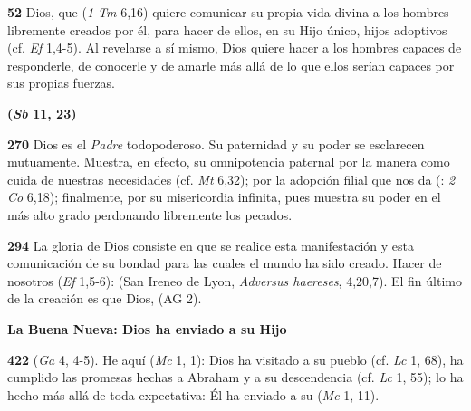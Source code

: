\textbf{52} Dios, que  (\emph{1 Tm} 6,16) quiere comunicar su propia vida divina a los hombres libremente creados por él, para hacer de ellos, en su Hijo único, hijos adoptivos (cf. \emph{Ef} 1,4-5). Al revelarse a sí mismo, Dios quiere hacer a los hombres capaces de responderle, de conocerle y de amarle más allá de lo que ellos serían capaces por sus propias fuerzas.

\textbf{ (\emph{Sb} 11, 23)}

\textbf{270} Dios es el \emph{Padre} todopoderoso. Su paternidad y su poder se esclarecen mutuamente. Muestra, en efecto, su omnipotencia paternal por la manera como cuida de nuestras necesidades (cf. \emph{Mt} 6,32); por la adopción filial que nos da (: \emph{2 Co} 6,18); finalmente, por su misericordia infinita, pues muestra su poder en el más alto grado perdonando libremente los pecados.

\textbf{294} La gloria de Dios consiste en que se realice esta manifestación y esta comunicación de su bondad para las cuales el mundo ha sido creado. Hacer de nosotros  (\emph{Ef} 1,5-6):  (San Ireneo de Lyon, \emph{Adversus haereses}, 4,20,7). El fin último de la creación es que Dios,  (AG 2).

\textbf{La Buena Nueva: Dios ha enviado a su Hijo}

\textbf{422}  (\emph{Ga} 4, 4-5). He aquí  (\emph{Mc} 1, 1): Dios ha visitado a su pueblo (cf. \emph{Lc} 1, 68), ha cumplido las promesas hechas a Abraham y a su descendencia (cf. \emph{Lc} 1, 55); lo ha hecho más allá de toda expectativa: Él ha enviado a su  (\emph{Mc} 1, 11).

